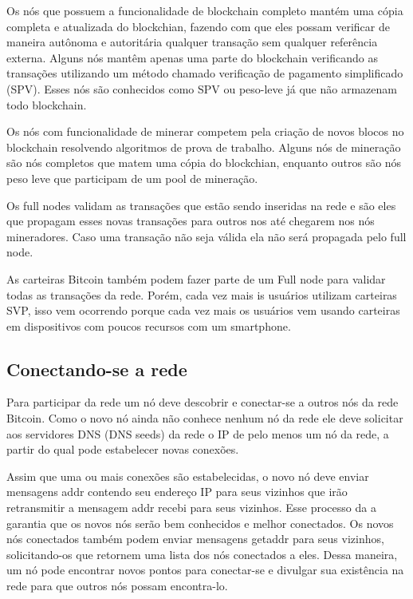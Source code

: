 \documentclass[conference,compsoc]{IEEEtran}
\begin{document}
Os nós que possuem a funcionalidade de blockchain completo mantém uma cópia completa e atualizada  do blockchian, fazendo com que eles possam verificar de maneira autônoma e autoritária qualquer transação sem qualquer referência externa. Alguns nós mantêm apenas uma parte do blockchain verificando as transações utilizando um método chamado verificação de pagamento simplificado (SPV). Esses nós são conhecidos como SPV ou peso-leve já que não armazenam todo blockchain.

Os nós com funcionalidade de minerar competem pela criação de novos blocos no blockchain resolvendo algoritmos de prova de trabalho. Alguns nós de mineração são nós completos que matem uma cópia do blockchian, enquanto outros são nós peso leve que participam de um pool de mineração. 

Os full nodes validam as transações que estão sendo inseridas na rede e são eles que propagam esses novas transações para outros nos até chegarem nos nós mineradores. Caso uma transação não seja válida ela não será propagada pelo full node.

As carteiras Bitcoin também podem fazer parte de um Full node para validar todas as transações da rede. Porém, cada vez mais is usuários utilizam carteiras SVP, isso vem ocorrendo porque cada vez mais os usuários vem usando carteiras em dispositivos com poucos recursos com um smartphone. 

\subsection*{Conectando-se a rede}

Para participar da rede um nó deve descobrir e conectar-se a outros nós da rede Bitcoin. Como o novo nó ainda não conhece nenhum nó da rede ele deve solicitar aos servidores DNS (DNS seeds) da rede o IP de pelo menos um nó da rede, a partir do qual pode estabelecer novas conexões.

Assim que uma ou mais conexões são estabelecidas, o novo nó deve enviar mensagens addr contendo seu endereço IP para seus vizinhos que irão retransmitir a mensagem addr recebi para seus vizinhos. Esse processo da a garantia que os novos nós serão bem conhecidos e melhor conectados. Os novos nós conectados também podem enviar mensagens getaddr para seus vizinhos, solicitando-os que retornem uma lista dos nós conectados a eles. Dessa maneira, um nó pode encontrar novos pontos para conectar-se e divulgar sua existência na rede para que outros nós possam encontra-lo.  
\end{document}
